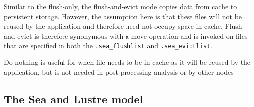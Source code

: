 Similar to the flush-only, the flush-and-evict mode copies data from cache to
persistent storage. However, the assumption here is that these files will not be
reused by the application and therefore need not occupy space in cache.
Flush-and-evict is therefore synonymous with a move operation and is invoked on
files that are specified in both the \texttt{.sea\_flushlist} and
\texttt{.sea\_evictlist}.


Do nothing is useful for when file needs to be in cache as it will be reused by
the application, but is not needed in post-processing analysis or by other nodes


\subsection{The Sea and Lustre model}\label{ss:sea-comp:model}


